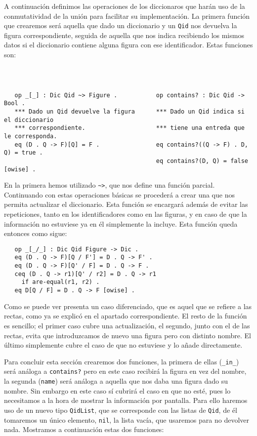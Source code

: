 A continuación definimos las operaciones de los diccionaros que harán uso de la conmutatividad de la unión para facilitar su implementación. La primera función que crearemos será aquella que dado un diccionario y un \texttt{Qid} nos devuelva la figura correspondiente, seguida de aquella que nos indica recibiendo los mismos datos si el diccionario contiene alguna figura con ese identificador. Estas funciones son:
{\codesize
\begin{verbatim}



   op _[_] : Dic Qid ~> Figure .           op contains? : Dic Qid -> Bool .
   *** Dado un Qid devuelve la figura      *** Dado un Qid indica si el diccionario
   *** correspondiente.                    *** tiene una entreda que le corresponda.
   eq (D . Q -> F)[Q] = F .                eq contains?((Q -> F) . D, Q) = true .
                                           eq contains?(D, Q) = false [owise] .

\end{verbatim}
}

En la primera hemos utilizado \verb"~>", que nos define una función parcial. Continuando con estas operaciones básicas se procederá a crear una que nos permita actualizar el diccionario. Esta función se encargará además de evitar las repeticiones, tanto en los identificadores como en las figuras, y en caso de que la información no estuviese ya en él simplemente la incluye. Esta función queda entonces como sigue:

{\codesize
\begin{verbatim}
   op _[_/_] : Dic Qid Figure -> Dic .
   eq (D . Q -> F)[Q / F'] = D . Q -> F' .
   eq (D . Q -> F)[Q' / F] = D . Q -> F .
   ceq (D . Q -> r1)[Q' / r2] = D . Q -> r1
     if are-equal(r1, r2) .   
   eq D[Q / F] = D . Q -> F [owise] .
\end{verbatim}
}

Como se puede ver presenta un caso diferenciado, que es aquel que se refiere a las rectas, como ya se explicó en el apartado correspondiente. El resto de la función es sencillo; el primer caso cubre una actualización, el segundo, junto con el de las rectas, evita que introduzcamos de nuevo una figura pero con distinto nombre. El último simplemente cubre el caso de que no estuviese y lo añade directamente.\par

Para concluir esta sección crearemos dos funciones, la primera de ellas (\verb"_in_") será análoga a \verb"contains?" pero en este caso recibirá la figura en vez del nombre, la segunda (\verb"name") será análoga a aquella que nos daba una figura dado su nombre. Sin embargo en este caso sí cubrirá el caso en que no esté, pues lo necesitamos a la hora de mostrar la información por pantalla. Para ello haremos uso de un nuevo tipo \verb"QidList", que se corresponde con las listas de \verb"Qid", de él tomaremos un único elemento, \verb"nil", la lista vacía, que usaremos para no devolver nada. Mostramos a continuación estas dos funciones:\par 

